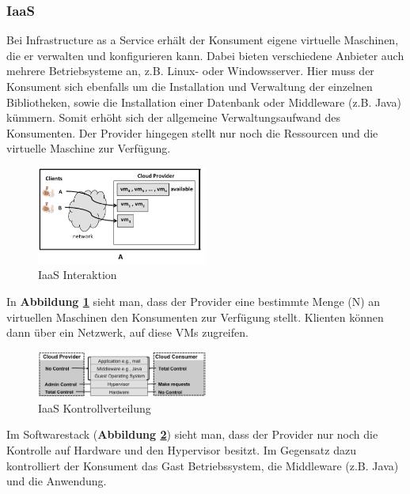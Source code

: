 \subsubsection{IaaS}
Bei Infrastructure as a Service erhält der Konsument eigene virtuelle Maschinen, die er verwalten und konfigurieren kann. Dabei bieten verschiedene Anbieter auch mehrere Betriebsysteme an, z.B.
Linux- oder Windowsserver. Hier muss der Konsument sich ebenfalls um die Installation und Verwaltung der einzelnen Bibliotheken, sowie die Installation einer Datenbank oder Middleware (z.B. Java) kümmern.
Somit erhöht sich der allgemeine Verwaltungsaufwand des Konsumenten. Der Provider hingegen stellt nur noch die Ressourcen und die virtuelle Maschine zur Verfügung. 
\begin{figure}[h]
    \centering
	\includegraphics[width=0.5\textwidth]{Images/IaaSInteraction}
	\caption{IaaS Interaktion \cite{Badger}}
	\label{IaaSInteraction}
\end{figure}
In \textbf{Abbildung \ref{IaaSInteraction}} sieht man, dass der Provider eine bestimmte Menge (N) an virtuellen Maschinen den Konsumenten zur Verfügung stellt. Klienten können dann über ein Netzwerk, auf diese VMs zugreifen.
\begin{figure}[h]
    \centering
	\includegraphics[width=0.5\textwidth]{Images/IaaSControl}
	\caption{IaaS Kontrollverteilung \cite{Badger}}
	\label{IaaSControl}
\end{figure}
Im Softwarestack (\textbf{Abbildung \ref{IaaSControl}}) sieht man, dass der Provider nur noch die Kontrolle auf Hardware und den Hypervisor besitzt.
Im Gegensatz dazu kontrolliert der Konsument das Gast Betriebssystem, die Middleware (z.B. Java) und die Anwendung\cite{Badger}.

